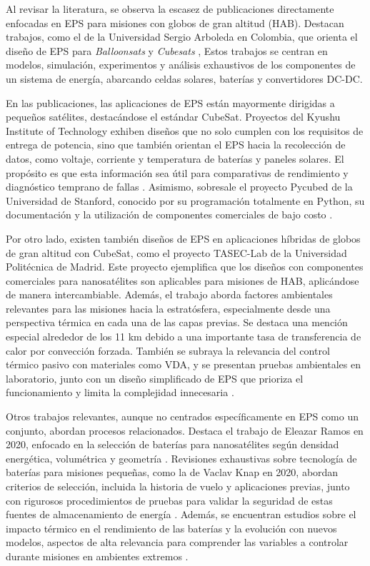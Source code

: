 Al revisar la literatura, se observa la escasez de publicaciones directamente enfocadas en EPS para misiones con globos de gran altitud (HAB). Destacan trabajos, como el de la Universidad Sergio Arboleda en Colombia, que orienta el diseño de EPS para \emph{Balloonsats} y \emph{Cubesats} \cite{Vecino2013, comparasun,energiasat}, Estos trabajos se centran en modelos, simulación, experimentos y análisis exhaustivos de los componentes de un sistema de energía, abarcando celdas solares, baterías y convertidores DC-DC.


En las publicaciones, las aplicaciones de EPS están mayormente dirigidas a pequeños satélites, destacándose el estándar CubeSat. Proyectos del Kyushu Institute of Technology exhiben diseños que no solo cumplen con los requisitos de entrega de potencia, sino que también orientan el EPS hacia la recolección de datos, como voltaje, corriente y temperatura de baterías y paneles solares. El propósito es que esta información sea útil para comparativas de rendimiento y diagnóstico temprano de fallas \cite{jara2022orbit}. Asimismo, sobresale el proyecto Pycubed de la Universidad de Stanford, conocido por su programación totalmente en Python, su documentación y la utilización de componentes comerciales de bajo costo \cite{pycubed}.


Por otro lado, existen también diseños de EPS en aplicaciones híbridas de globos de gran altitud con CubeSat, como el proyecto TASEC-Lab de la Universidad Politécnica de Madrid. Este proyecto ejemplifica que los diseños con componentes comerciales para nanosatélites son aplicables para misiones de HAB, aplicándose de manera intercambiable. Además, el trabajo aborda factores ambientales relevantes para las misiones hacia la estratósfera, especialmente desde una perspectiva térmica en cada una de las capas previas. Se destaca una mención especial alrededor de los 11 km debido a una importante tasa de transferencia de calor por convección forzada. También se subraya la relevancia del control térmico pasivo con materiales como VDA, y se presentan pruebas ambientales en laboratorio, junto con un diseño simplificado de EPS que prioriza el funcionamiento y limita la complejidad innecesaria \cite{TASEC}.


Otros trabajos relevantes, aunque no centrados específicamente en EPS como un conjunto, abordan procesos relacionados. Destaca el trabajo de Eleazar Ramos en 2020, enfocado en la selección de baterías para nanosatélites según densidad energética, volumétrica y geometría \cite{Eleazar2020}. Revisiones exhaustivas sobre tecnología de baterías para misiones pequeñas, como la de Vaclav Knap en 2020, abordan criterios de selección, incluida la historia de vuelo y aplicaciones previas, junto con rigurosos procedimientos de pruebas para validar la seguridad de estas fuentes de almacenamiento de energía \cite{Knap2020}. Además, se encuentran estudios sobre el impacto térmico en el rendimiento de las baterías y la evolución con nuevos modelos, aspectos de alta relevancia para comprender las variables a controlar durante misiones en ambientes extremos \cite{Ma2018}.

